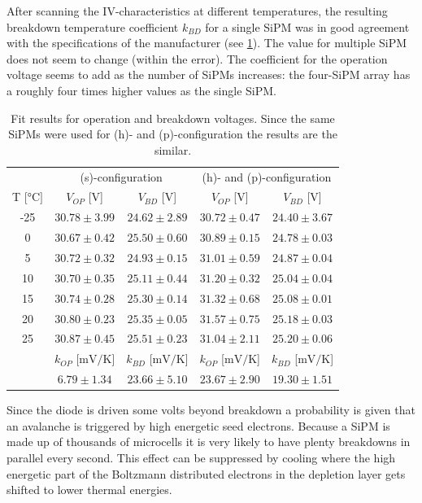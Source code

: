 \documentclass[%
 reprint,
 amsmath,amssymb,
 aps,
]{revtex4-1}
\begin{document}
After scanning the IV-characteristics at different temperatures, the resulting breakdown temperature coefficient $k_{BD}$ for a single SiPM was in good agreement with the specifications of the manufacturer \cite{SiPM_Manual} (see \ref{tab:IV_cata}). The value for multiple SiPM does not seem to change (within the error). The coefficient for the operation voltage seems to add as the number of SiPMs increases: the four-SiPM array has a roughly four times higher values as the single SiPM. \\ \indent
\begin{table}[t!]
	\centering
	\begin{tabular}{ c|cc|cc } \toprule[2pt]
		& \multicolumn{2}{c|}{(s)-configuration} & \multicolumn{2}{c}{(h)- and (p)-configuration} \\
		T [$\si{\degreeCelsius}]$ & $V_{OP}$ [$\si{\volt}$] & $V_{BD}$ [$\si{\volt}$] & $V_{OP}$ [$\si{\volt}$] & $V_{BD}$ [$\si{\volt}$]  \\ \midrule
		-25 & $30.78\pm 3.99$ & $24.62\pm 2.89$ & $30.72\pm 0.47$ & $24.40\pm 3.67$ \\
		0 & $30.67\pm 0.42$ & $25.50\pm 0.60$ & $30.89\pm 0.15$ & $24.78\pm 0.03$ \\
		5 & $30.72\pm 0.32$ & $24.93\pm 0.15$ & $31.01\pm 0.59$ & $24.87\pm 0.04$ \\
		10 & $30.70\pm 0.35$ & $25.11\pm 0.44$ & $31.20\pm 0.32$ & $25.04\pm 0.04$ \\
		15 & $30.74\pm 0.28$ & $25.30\pm 0.14$ & $31.32\pm 0.68$ & $25.08\pm 0.01$ \\
		20 & $30.80\pm 0.23$ & $25.35\pm 0.05$ & $31.57\pm 0.75$ & $25.18\pm 0.03$ \\
		25 & $30.87\pm 0.45$ & $25.51\pm 0.23$ & $31.04\pm 2.11$ & $25.20\pm 0.06$ \\
		\midrule
		& $k_{OP}$ [$\si{\milli\volt\per\kelvin}$] & $k_{BD}$ [$\si{\milli\volt\per\kelvin}$] & $k_{OP}$ [$\si{\milli\volt\per\kelvin}$] & $k_{BD}$ [$\si{\milli\volt\per\kelvin}$]  \\
		& $6.79\pm 1.34$ & $23.66\pm 5.10$ & $23.67\pm 2.90$ & $19.30\pm 1.51$ \\
		\bottomrule[2pt]
	\end{tabular}
	\caption[Fit results for operation and breakdown voltages]{Fit results for operation and breakdown voltages. Since the same SiPMs were used for (h)- and (p)-configuration the results are the similar.}
	\label{tab:IV_cata}
\end{table}  
Since the diode is driven some volts beyond breakdown a probability is given that an avalanche is triggered by high energetic seed electrons. Because a SiPM is made up of thousands of microcells it is very likely to have plenty breakdowns in parallel every second. This effect can be suppressed by cooling where the high energetic part of the Boltzmann distributed electrons in the depletion layer gets shifted to lower thermal energies. \\ \indent
\end{document}
